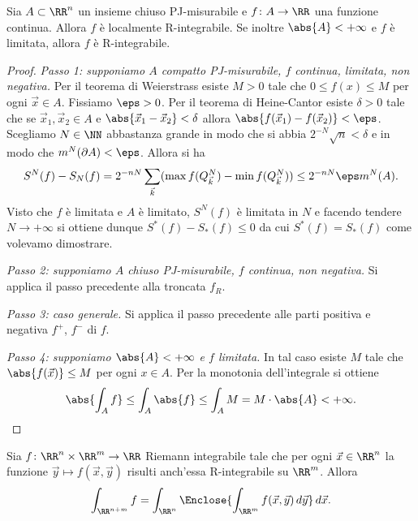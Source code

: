 \begin{theorem}
  \label{th:continua_integrabile}
Sia $A\subset \RR^n$ un insieme chiuso PJ-misurabile e $f\colon A \to \RR$ una funzione 
continua. Allora $f$ è localmente R-integrabile. 
Se inoltre $\abs{A}<+\infty$ e $f$ 
è limitata, allora $f$ è R-integrabile.
\end{theorem}
%
\begin{proof}
\emph{Passo 1: supponiamo $A$ compatto PJ-misurabile, 
$f$ continua, limitata, non negativa.}
Per il teorema di Weierstrass esiste $M>0$ tale che $0\le f(x) \le M$ per 
ogni $\vec x \in A$.
Fissiamo $\eps>0$.
Per il teorema di Heine-Cantor esiste $\delta>0$ tale 
che se $\vec x_1,\vec x_2\in A$ e $\abs{\vec x_1 -\vec x_2}<\delta$ 
allora $\abs{f(\vec x_1)-f(\vec x_2)}< \eps$. 
Scegliamo $N\in \NN$ abbastanza grande in modo che si abbia $2^{-N}\sqrt n < \delta$
e in modo che $m^N(\partial A)<\eps$.
Allora si ha
\[
  S^N(f) - S_N(f) 
  = 2^{-nN}\sum_{\vec k} (\max f(Q^N_{\vec k})-\min f(Q^N_{\vec k})) 
  \le 2^{-nN}\eps m^N(A).
\]
Visto che $f$ è limitata e $A$ è limitato, $S^N(f)$ è limitata in $N$ 
e facendo tendere $N\to+\infty$ si ottiene 
dunque $S^*(f)-S_*(f) \le 0$ da cui $S^*(f)=S_*(f)$ come volevamo dimostrare.

\emph{Passo 2: supponiamo $A$ chiuso PJ-misurabile, $f$ continua, non negativa.} 
Si applica il passo precedente alla troncata $f_R$.

\emph{Passo 3: caso generale.}
Si applica il passo precedente alle parti 
positiva e negativa $f^+$, $f^-$ di $f$.

\emph{Passo 4: supponiamo $\abs{A}<+\infty$ e $f$ limitata.}  
In tal caso esiste $M$ tale che $\abs{f(\vec x)}\le M$ per 
ogni $x\in A$. 
Per la monotonia dell'integrale si ottiene 
\[
  \abs{\int_A f} 
  \le \int_A \abs{f}
  \le \int_A M = M \cdot \abs{A} < +\infty.  
\]
\end{proof}

\begin{theorem}
Sia $f\colon \RR^n\times \RR^m \to \RR$ Riemann integrabile
tale che per ogni $\vec x\in \RR^n$ la funzione $\vec y \mapsto f(\vec x,\vec y)$ 
risulti anch'essa R-integrabile su $\RR^m$.
Allora 
\[
  \int_{\RR^{n+m}} f = \int_{\RR^n} \Enclose{\int_{\RR^m} f(\vec x, \vec y)\, d\vec y}\, d\vec x.
\]
\end{theorem}

